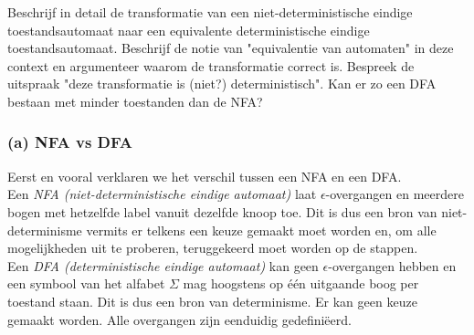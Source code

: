 \begin{question}
Beschrijf in detail de transformatie van een niet-deterministische eindige toestandsautomaat naar een equivalente deterministische eindige toestandsautomaat. Beschrijf de notie van "equivalentie van automaten" in deze context en argumenteer waarom de transformatie correct is. Bespreek de uitspraak "deze transformatie is (niet?) deterministisch". Kan er zo een DFA bestaan met minder toestanden dan de NFA?
\end{question}

\subsubsection*{(a) NFA vs DFA}
Eerst en vooral verklaren we het verschil tussen een NFA en een DFA. \\
Een \emph{NFA (niet-deterministische eindige automaat)} laat $\epsilon$-overgangen en meerdere bogen met hetzelfde label vanuit dezelfde knoop toe. Dit is dus een bron van niet-determinisme vermits er telkens een keuze gemaakt moet worden en, om alle mogelijkheden uit te proberen, teruggekeerd moet worden op de stappen.  \\
Een \emph{DFA (deterministische eindige automaat)} kan geen $\epsilon$-overgangen hebben en een symbool van het alfabet $\Sigma$ mag hoogstens op \'e\'en  uitgaande boog per toestand staan. Dit is dus een bron van determinisme. Er kan geen keuze gemaakt worden. Alle overgangen zijn eenduidig gedefini\"eerd.

